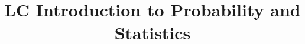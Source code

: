 \documentclass[a4paper]{article}
\title{LC Introduction to Probability and Statistics}
\begin{document}
    \maketitle
    \hrulefill
    \tableofcontents
    
    
\end{document}
